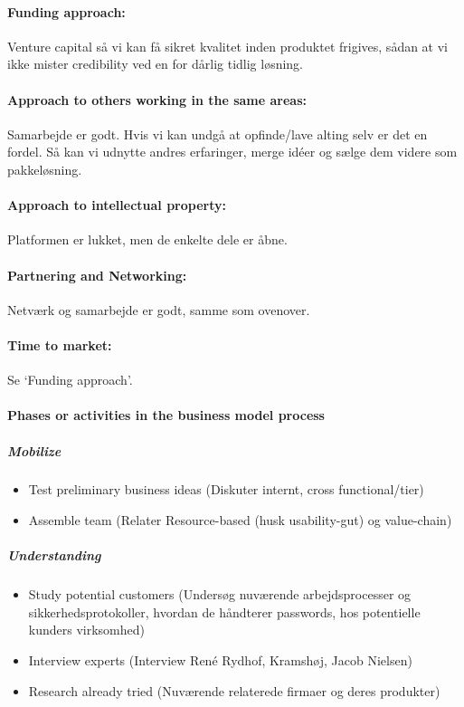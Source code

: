 \documentclass[a4paper]{article}
\begin{document}
\paragraph{Funding approach:} Venture capital så vi kan få sikret kvalitet inden produktet frigives, sådan at vi ikke mister credibility ved en for dårlig tidlig løsning.

\paragraph{Approach to others working in the same areas:} Samarbejde er godt.
Hvis vi kan undgå at opfinde/lave alting selv er det en fordel.
Så kan vi udnytte andres erfaringer, merge idéer og sælge dem videre som pakkeløsning.

\paragraph{Approach to intellectual property:} Platformen er lukket, men de enkelte dele er åbne.

\paragraph{Partnering and Networking:} Netværk og samarbejde er godt, samme som ovenover.

\paragraph{Time to market:} Se `Funding approach'.

\paragraph{Phases or activities in the business model process}

\subparagraph{Mobilize}
\begin{itemize}
\item Test preliminary business ideas (Diskuter internt, cross functional/tier)
\item Assemble team (Relater Resource-based (husk usability-gut) og value-chain)
\end{itemize}

\subparagraph{Understanding}
\begin{itemize}
\item Study potential customers (Undersøg nuværende arbejdsprocesser og sikkerhedsprotokoller, hvordan de håndterer passwords, hos potentielle kunders virksomhed)
\item Interview experts (Interview René Rydhof, Kramshøj, Jacob Nielsen)
\item Research already tried (Nuværende relaterede firmaer og deres produkter)
\end{itemize}
\end{document}
